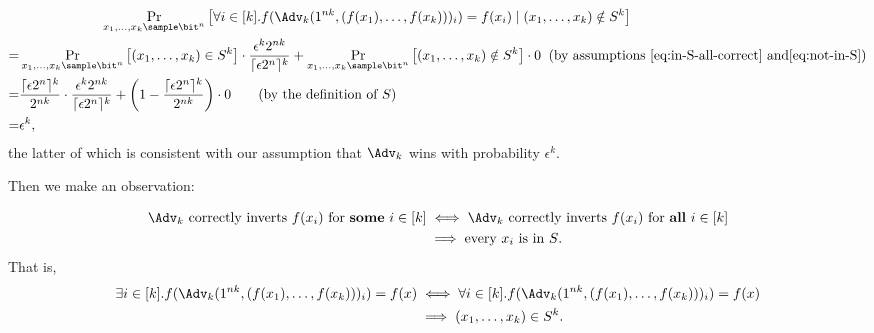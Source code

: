 \begin{answer}[i]
\begin{align*}
            &\qquad\qquad\qquad \Pr_{x_1,\ldots,x_k\sample\bit^n}\left[ \forall i\in [k].f(\Adv_k(1^{nk}, (f(x_1),\ldots,f(x_k)))_i) = f(x_i) \mid (x_1,\ldots,x_k)\notin S^k \right]\\
        =& \Pr_{x_1,\ldots,x_k\sample\bit^n}\left[ (x_1,\ldots,x_k)\in S^k \right]
            \cdot \frac{\epsilon^k 2^{nk}}{\lceil \epsilon 2^n\rceil^k}
            + \Pr_{x_1,\ldots,x_k\sample\bit^n}\left[ (x_1,\ldots,x_k)\notin S^k \right]
            \cdot 0
            \;\; \textrm{(by assumptions \eqref{eq:in-S-all-correct} and\eqref{eq:not-in-S})}\\
        =& \frac{\lceil \epsilon 2^n\rceil^k}{2^{nk}}
            \cdot \frac{\epsilon^k 2^{nk}}{\lceil \epsilon 2^n\rceil^k}
            + \left(1-\frac{\lceil \epsilon 2^n\rceil^k}{2^{nk}}\right) \cdot 0
            \qquad \textrm{(by the definition of $S$)}\\
        =& \epsilon^k,
    \end{align*}
    the latter of which is consistent with our assumption that $\Adv_k$ wins with probability $\epsilon^k$.

    Then we make an observation:
    \begin{observation}\label{obs:p5-1-1}
        \begin{align*}
            \textrm{$\Adv_k$ correctly inverts $f(x_i)$ for \textbf{some} $i\in[k]$}
            &\iff \textrm{$\Adv_k$ correctly inverts $f(x_i)$ for \textbf{all} $i\in[k]$} \\
            &\implies  \textrm{every $x_i$ is in $S$}.
        \end{align*}
        That is,
        \begin{align*}
            \exists i\in[k]. f(\Adv_k(1^{nk}, (f(x_1),\ldots,f(x_k)))_i)=f(x)
            &\iff \forall i\in[k]. f(\Adv_k(1^{nk}, (f(x_1),\ldots,f(x_k)))_i)=f(x) \\
            &\implies  (x_1,\ldots,x_k)\in S^k.
        \end{align*}
    \end{observation}


\end{answer}
